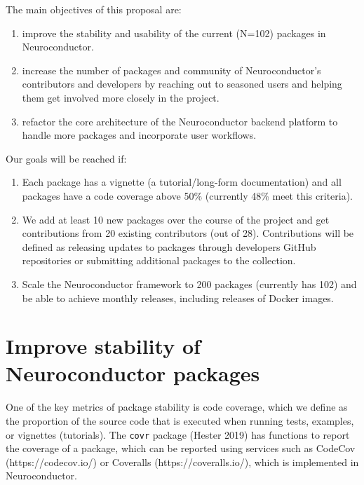 \documentclass[]{elsarticle} %
\providecommand{\tightlist}{%
  \setlength{\itemsep}{0pt}\setlength{\parskip}{0pt}}
\begin{document}
The main objectives of this proposal are:

\begin{enumerate}
\def\labelenumi{\arabic{enumi}.}
\tightlist
\item
  improve the stability and usability of the current (N=102) packages in Neuroconductor.
\item
  increase the number of packages and community of Neuroconductor's contributors and developers by reaching out to seasoned users and helping them get involved more closely in the project.
\item
  refactor the core architecture of the Neuroconductor backend platform to handle more packages and incorporate user workflows.
\end{enumerate}

Our goals will be reached if:

\begin{enumerate}
\def\labelenumi{\arabic{enumi}.}
\tightlist
\item
  Each package has a vignette (a tutorial/long-form documentation) and all packages have a code coverage above 50\% (currently 48\% meet this criteria).
\item
  We add at least 10 new packages over the course of the project and get contributions from 20 existing contributors (out of 28). Contributions will be defined as releasing updates to packages through developers GitHub repositories or submitting additional packages to the collection.
\item
  Scale the Neuroconductor framework to 200 packages (currently has 102) and be able to achieve monthly releases, including releases of Docker images.
\end{enumerate}

\hypertarget{improve-stability-of-neuroconductor-packages}{%
\section{Improve stability of Neuroconductor packages}\label{improve-stability-of-neuroconductor-packages}}

One of the key metrics of package stability is code coverage, which we define as the proportion of the source code that is executed when running tests, examples, or vignettes (tutorials). The \texttt{covr} package (Hester 2019) has functions to report the coverage of a package, which can be reported using services such as CodeCov (https://codecov.io/) or Coveralls (https://coveralls.io/), which is implemented in Neuroconductor.
\end{document}
